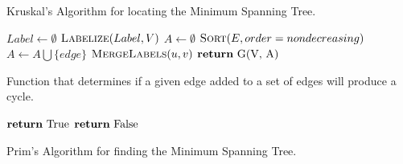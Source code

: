 \documentclass{article}
\begin{document}

\pagebreak
\begin{algorithm}[H]
\caption{
Kruskal's Algorithm for locating the Minimum Spanning Tree.
}
\label{alg:algorithm-label}
\begin{algorithmic}[1]
     
        \State $ Label \gets \emptyset $
        \State $ \Call{Labelize}{Label, V} $
        \State $ A \gets \emptyset $
        \State $ \Call{Sort}{E, order=nondecreasing} $
                \State $ A \gets A \bigcup \{edge\} $
                \State $ \Call{MergeLabels}{u, v} $ 
            \EndIf
        \EndFor
        \State $ \Return \text{ G(V, A)} $
    \EndFunction
\end{algorithmic}
\end{algorithm}

\begin{algorithm}[H]
\caption{
    Function that determines if a given edge added
    to a set of edges will produce a cycle.
}
\label{alg:algorithm-label}
\begin{algorithmic}[1]
            \State $ \Return \text{ True} $
        \Else
            \State $ \Return \text{ False} $
        \EndIf
    \EndFunction
\end{algorithmic}
\end{algorithm}


\pagebreak
\begin{algorithm}[H]
\caption{
Prim's Algorithm for finding the Minimum Spanning Tree.
}
\label{alg:algorithm-label}
\begin{algorithmic}[1]
        
    \EndFunction
\end{algorithmic}
\end{algorithm}
\end{document}
